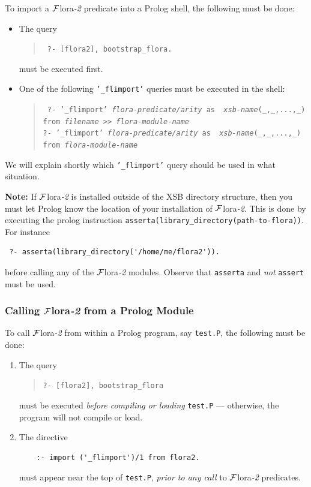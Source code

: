 \documentclass[11pt]{article}
\newcommand{\FLORA}{{\mbox{\sc ${\cal F}${lora}\rm\emph{-2}}}\xspace}
\begin{document}
To import a \FLORA predicate into a Prolog shell, the following must be done:
\begin{itemize}
\item The query
\begin{quote}
  \tt
     ?- [flora2], bootstrap\_flora.  
\end{quote}
must be executed first.
\item 
  One of the following {\tt '\_flimport'} queries must be executed in the shell:
  \begin{quote}
    \tt
        ?- '\_flimport' {\it flora-predicate/arity} as {\it
      xsb-name}(\_,\_,...,\_)\\
    \hspace*{5cm}from {\it filename} >> {\it flora-module-name}
    \\
        ?- '\_flimport' {\it flora-predicate/arity} as {\it 
      xsb-name}(\_,\_,...,\_)\\
    \hspace*{5cm}from {\it flora-module-name}
  \end{quote}
\end{itemize}
We will explain shortly which {\tt '\_flimport'} query should be used in what
situation.

{\bf Note:} If \FLORA is installed outside of the XSB directory structure,
then you must let Prolog know the location of your installation of \FLORA.
This is done by executing the prolog instruction 
{\tt asserta(library\_directory(path-to-flora))}. For instance
\begin{verbatim}
 ?- asserta(library_directory('/home/me/flora2')).  
\end{verbatim}
before calling any of the \FLORA modules. Observe that {\tt asserta} and
\emph{not} {\tt assert} must be used.

\subsubsection{Calling \FLORA from a Prolog Module}

To call \FLORA from within a Prolog program, say {\tt test.P}, the
following must be done:
\begin{enumerate}
\item  The query 
  \begin{quote}
    {\tt ?- [flora2], bootstrap\_flora} 
  \end{quote}
  must be executed \emph{before compiling or loading} {\tt test.P} ---
  otherwise, the program will not compile or load.
\item The directive
  \begin{verbatim}
    :- import ('_flimport')/1 from flora2.
  \end{verbatim}
  must appear near the top of {\tt test.P}, \emph{prior to any call} to
  \FLORA predicates.
\end{enumerate}
\end{document}
